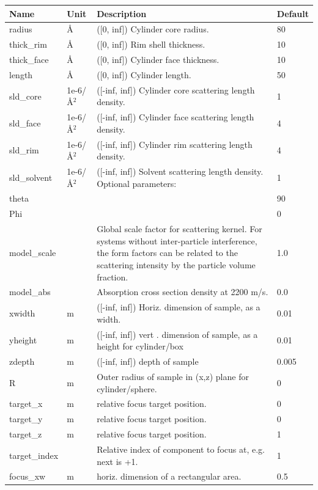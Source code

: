 \begin{longtable}{p{}p{}p{}p{}}
\toprule
\textbf{Name} & \textbf{Unit} & \textbf{Description} & \textbf{Default} \\
\midrule
\endhead
radius & \AA{} & ([0, inf]) Cylinder core radius. & 80 \\
thick\_rim & \AA{} & ([0, inf]) Rim shell thickness. & 10 \\
thick\_face & \AA{} & ([0, inf]) Cylinder face thickness. & 10 \\
length & \AA{} & ([0, inf]) Cylinder length. & 50 \\
sld\_core & 1e-6/\AA{}$^{2}$ & ([-inf, inf]) Cylinder core scattering length density. & 1 \\
sld\_face & 1e-6/\AA{}$^{2}$ & ([-inf, inf]) Cylinder face scattering length density. & 4 \\
sld\_rim & 1e-6/\AA{}$^{2}$ & ([-inf, inf]) Cylinder rim scattering length density. & 4 \\
sld\_solvent & 1e-6/\AA{}$^{2}$ & ([-inf, inf]) Solvent scattering length density. Optional parameters: & 1 \\
theta &  &  & 90 \\
Phi &  &  & 0 \\
model\_scale &   & Global scale factor for scattering kernel. For systems without inter-particle interference, the form factors can be related to the scattering intensity by the particle volume fraction. & 1.0 \\
model\_abs &   & Absorption cross section density at 2200 m/s. & 0.0 \\
xwidth & m & ([-inf, inf]) Horiz. dimension of sample, as a width. & 0.01 \\
yheight & m & ([-inf, inf]) vert . dimension of sample, as a height for cylinder/box & 0.01 \\
zdepth & m & ([-inf, inf]) depth of sample & 0.005 \\
R & m & Outer radius of sample in (x,z) plane for cylinder/sphere. & 0 \\
target\_x & m & relative focus target position. & 0 \\
target\_y & m & relative focus target position. & 0 \\
target\_z & m & relative focus target position. & 1 \\
target\_index &   & Relative index of component to focus at, e.g. next is +1. & 1 \\
focus\_xw & m & horiz. dimension of a rectangular area. & 0.5 \\

\end{longtable}
